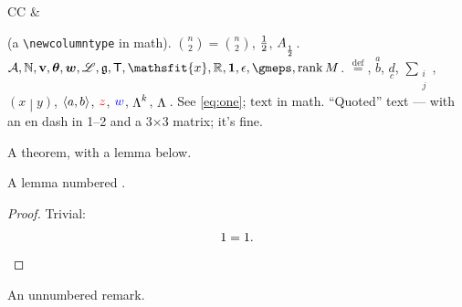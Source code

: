 \begin{tabular}{CC} \alpha & \beta \end{tabular} (a \verb|\newcolumntype| in math).
$\binom{n}{2} = {n \choose 2}$, ${1 \over 2}$, $A_{_{1\over 2}}$.
$\mathcal{A}, \mathbb{N}, \mathbf{v}, \boldsymbol{\theta}, \bm{w}, \mathscr{L},
\mathfrak{g}, \mathsf{T}, \mathsfit{x}, \R, \1, \eps, \gmeps, \operatorname{rank} M$.
$\stackrel{\mathrm{def}}{=}$, $\overset{a}{b}$, $\underset{c}{d}$, $\sum_{\substack{i \\ j}}$,
$\left( x \middle| y \right)$, $\gmpair(a,b)$, $\gmmathcolor{red}{z}$, $\gmmathcolor[rgb]{0,0,1}{w}$, $\gmextp^{k}$, $\gmextp$.
See \eqref{eq:one}; $\text{text}$ in math.
“Quoted” text — with an en dash in 1–2 and a 3×3 matrix; it’s fine.
\renewcommand{\arraystretch}{1.2}%
\newcommand{\gmlate}{late}
\begin{theorem}\label{thm:one} A theorem, with a lemma below. \end{theorem}
\begin{lemma} A lemma numbered \thelemma. \end{lemma}
\begin{proof} Trivial: \[ 1 = 1. \qedhere \] \end{proof}
\begin{remark*} An unnumbered remark. \end{remark*}
